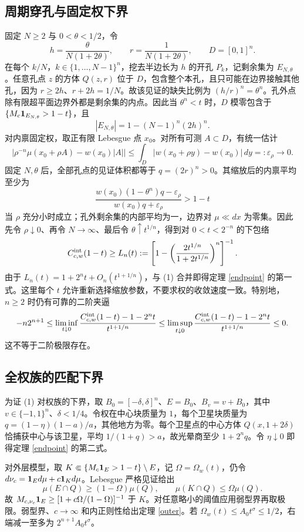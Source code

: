 \documentclass[UTF8,11pt,fontset=none]{ctexart}
\theoremstyle{definition}\newtheorem{theorem}{定理}[section]\newtheorem{lemma}[theorem]{引理}\newtheorem{corollary}[theorem]{推论}\newtheorem{proposition}[theorem]{命题}
\theoremstyle{remark}\newtheorem{remark}[theorem]{说明}
\begin{document}
\subsection{周期穿孔与固定权下界}
固定 $N\ge2$ 与 $0<\theta<1/2$，令
\[
 h=\frac{\theta}{N(1+2\theta)},\qquad r=\frac1{N(1+2\theta)},\qquad D=[0,1]^n.
\]
在每个 $k/N$，$k\in\{1,\ldots,N-1\}^n$，挖去半边长为 $h$ 的开孔 $P_k$，记剩余集为 $E_{N,\theta}$。任意孔点 $z$ 的方体 $Q(z,r)$ 位于 $D$，包含整个本孔，且只可能在边界接触其他孔，因为 $r\ge2h$、$r+2h=1/N$。故该见证的缺失比例为 $(h/r)^n=\theta^n$。孔外点除有限超平面边界外都是剩余集的内点。因此当 $\theta^n<t$ 时，$D$ 模零包含于 $\{M_c\mathbf 1_{E_{N,\theta}}>1-t\}$，且
\[
 |E_{N,\theta}|=1-(N-1)^n(2h)^n.
\]
对内禀固定权，取正有限 Lebesgue 点 $x_0$。对所有可测 $A\subset D$，有统一估计
\[
 \left|\rho^{-n}\mu(x_0+\rho A)-w(x_0)|A|\right|
 \le\int_D|w(x_0+\rho y)-w(x_0)|\,dy=:\varepsilon_\rho\longrightarrow0.
\]
固定 $N,\theta$ 后，全部孔点的见证体积都等于 $q=(2r)^n>0$。其缩放后的内禀平均至少为
\[
 \frac{w(x_0)(1-\theta^n)q-\varepsilon_\rho}
 {w(x_0)q+\varepsilon_\rho}>1-t
\]
当 $\rho$ 充分小时成立；孔外剩余集的内部平均为一，边界对 $\mu\ll dx$ 为零集。因此先令 $\rho\downarrow0$、再令 $N\to\infty$、最后令 $\theta\uparrow t^{1/n}$，得到对 $0<t<2^{-n}$ 的下包络
\[
 C^{\rm int}_{c,w}(1-t)\ge L_n(t):=
 \left[1-\left(\frac{2t^{1/n}}{1+2t^{1/n}}\right)^n\right]^{-1}.
\]
由于 $L_n(t)=1+2^nt+O_n(t^{1+1/n})$，与 (1) 合并即得定理 \ref{endpoint} 的第一式。这里每个 $t$ 允许重新选择缩放参数，不要求权的收敛速度一致。特别地，$n\ge2$ 时仍有可靠的二阶夹逼
\[
 -n2^{n+1}\le\liminf_{t\downarrow0}\frac{C^{\rm int}_{c,w}(1-t)-1-2^nt}{t^{1+1/n}}
 \le\limsup_{t\downarrow0}\frac{C^{\rm int}_{c,w}(1-t)-1-2^nt}{t^{1+1/n}}\le0.
\]
这不等于二阶极限存在。
\subsection{全权族的匹配下界}
为证 (1) 对权族的下界，取 $B_0=[-\delta,\delta]^n$、$E=B_0$、$B_v=v+B_0$，其中 $v\in\{-1,1\}^n$、$\delta<1/4$。令权在中心块质量为 $1$，每个卫星块质量为 $q=(1-\eta)(1-a)/a$，其他地方为零。每个卫星点的中心方体 $Q(x,1+2\delta)$ 恰捕获中心与该卫星，平均 $1/(1+q)>a$，故光晕商至少 $1+2^nq$。令 $\eta\downarrow0$ 即得定理 \ref{endpoint} 的第二式。

对外层模型，取 $K\Subset\{M_c\mathbf 1_E>1-t\}\setminus E$，记 $\Omega=\Omega_w(t)$，仍令 $d\nu_c=\mathbf 1_Ed\mu+c\mathbf 1_Kd\mu$。Lebesgue 严格见证给出
\[\mu(E\cap Q)\ge(1-\Omega)\mu(Q),\qquad\mu(K\cap Q)\le\Omega\mu(Q).\]
故 $M_{c,\nu_c}\mathbf 1_E\ge[1+c\Omega/(1-\Omega)]^{-1}$ 于 $K$。对任意略小的阈值应用弱型界再取极限。弱型界、$c\to\infty$ 和内正则性给出定理 \ref{outer}。若 $\Omega_w(t)\le A_0t^\sigma\le1/2$，右端减一至多为 $2^{n+1}A_0t^\sigma$。
\end{document}
